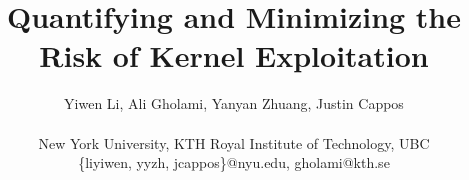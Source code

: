 \documentclass[letterpaper,twocolumn,10pt]{article}
\begin{document}




\title{Quantifying and Minimizing the Risk of Kernel Exploitation}

\author{
{\rm Yiwen Li, Ali Gholami, Yanyan Zhuang, Justin Cappos}\\\\
New York University, KTH Royal Institute of Technology, UBC \\
\{liyiwen, yyzh, jcappos\}@nyu.edu, gholami@kth.se
} %


\maketitle


















{
\footnotesize 


}



\end{document}
